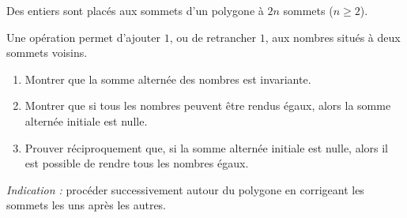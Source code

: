 Des entiers sont placés aux sommets d'un polygone à $2n$ sommets ($n \geq 2$).

Une opération permet d'ajouter $1$, ou de retrancher $1$, aux nombres situés
à deux sommets voisins.
\begin{enumerate}
  \item Montrer que la somme alternée des nombres est invariante.
  \item Montrer que si tous les nombres peuvent être rendus égaux, alors la
  somme alternée initiale est nulle.
  \item Prouver réciproquement que, si la somme alternée initiale est nulle,
  alors il est possible de rendre tous les nombres égaux.
\end{enumerate}
\emph{Indication :} procéder successivement autour du polygone en corrigeant
les sommets les uns après les autres.
